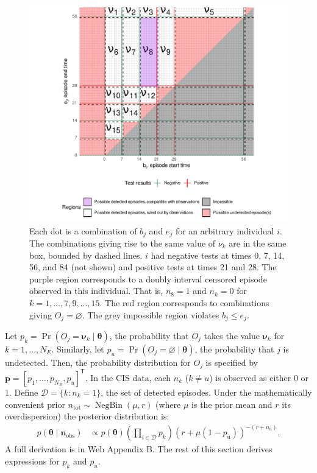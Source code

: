 \documentclass[referee,useAMS,usenatbib]{biom}
\def\dist{\sim}
\DeclareMathOperator{\prob}{\mathrm{Pr}}
\DeclareMathOperator{\NBr}{NegBin}
\newcommand{\NBc}{\NBr}
\newcommand\set{\mathcal}
\renewcommand{\vec}[1]{\bm{#1}}
\newcommand{\ssep}{:}
\newcommand{\ntot}{n_\text{tot}}
\newcommand{\ndet}{n_\text{d}}
\newcommand{\pnodet}{p_\text{u}}
\newcommand{\na}{\vec{n}_\text{obs}}
\begin{document}
\begin{figure}
    \includegraphics{figures/output/regions_diag}
    \caption[Episode regions]{%
      Each dot is a combination of $b_j$ and $e_j$ for an arbitrary individual $i$.
      The combinations giving rise to the same value of $\nu_k$ are in the same box, bounded by dashed lines.
      $i$ had negative tests at times 0, 7, 14, 56, and 84 (not shown) and positive tests at times 21 and 28.
      The purple region corresponds to a doubly interval censored episode observed in this individual.
      That is, $n_8 = 1$ and $n_k = 0$ for $k = 1, \dots, 7, 9, \dots, 15$.
      The red region corresponds to combinations giving $O_j = \varnothing$.
      The grey impossible region violates $b_j \leq e_j$.
    }
    \label{perf-test:fig:partitionSpace}
\end{figure}

Let $p_k = \prob(O_j = \vec{\nu}_k \mid \vec{\theta})$, the probability that $O_j$ takes the value $\vec{\nu}_k$ for $k = 1, \dots, N_E$.
Similarly, let $p_u = \prob(O_j = \varnothing \mid \vec{\theta})$, the probability that $j$ is undetected.
Then, the probability distribution for $O_j$ is specified by $\vec{p} = [p_1, \dots, p_{N_E}, p_u]^{\mathsf{T}}$.
In the CIS data, each $n_k$ ($k \neq u$) is observed as either 0 or 1.
Define $\set{D} = \{ k \ssep n_k = 1 \}$, the set of detected episodes.
Under the mathematically convenient prior $\ntot \dist \NBc(\mu, r)$ (where $\mu$ is the prior mean and $r$ its overdispersion) the posterior distribution is:
\begin{align}
p(\vec{\theta} \mid \na)
&\propto p(\vec{\theta}) \left( \prod_{i \in \set{D}} p_k \right) (r + \mu (1- \pnodet))^{-(r+\ndet)} \label{perf-test:eq:full-posterior}.
\end{align}
A full derivation is in Web Appendix B.
The rest of this section derives expressions for $p_{k}$ and $p_{u}$.
\end{document}
